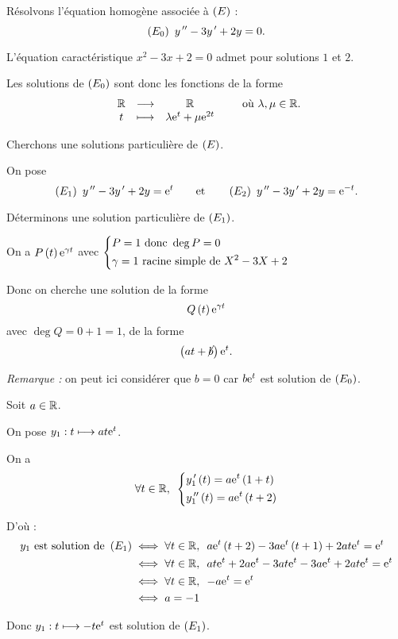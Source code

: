 \begin{corr}[1]
Résolvons l'équation homogène associée à \(\left(E\right)\) : \[\left(E_0\right)~y^{\,\prime\prime}-3y^{\,\prime}+2y=0.\]

L'équation caractéristique \(x^2-3x+2=0\) admet pour solutions \(1\) et \(2\).

Les solutions de \(\left(E_0\right)\) sont donc les fonctions de la forme \[\begin{array}[t]{ccc}\mathbb{R} & \longrightarrow & \mathbb{R} \\ t & \longmapsto & \lambda\mathrm{e}^{t}+\mu\mathrm{e}^{2t}\end{array}\qquad\text{où }\lambda,\mu\in\mathbb{R}.\]

Cherchons une solutions particulière de \(\left(E\right)\).

On pose \[\left(E_1\right)~y^{\,\prime\prime}-3y^{\,\prime}+2y=\mathrm{e}^{t}\qquad\text{et}\qquad\left(E_2\right)~y^{\,\prime\prime}-3y^{\,\prime}+2y=\mathrm{e}^{-t}.\]

Déterminons une solution particulière de \(\left(E_1\right)\).

\begin{brouill}
On a \(P\left(t\right)\mathrm{e}^{\gamma t}\) avec \(\begin{dcases}
P=1\text{ donc }\deg P=0 \\
\gamma=1\text{ racine simple de }X^2-3X+2
\end{dcases}\)

Donc on cherche une solution de la forme \[Q\left(t\right)\mathrm{e}^{\gamma t}\] avec \(\deg Q=0+1=1\), \cad de la forme \[\left(at+\cancel{b}\right)\mathrm{e}^{t}.\]

\textit{Remarque :} on peut ici considérer que \(b=0\) car \(b\mathrm{e}^{t}\) est solution de \(\left(E_0\right)\).
\end{brouill}

Soit \(a\in\mathbb{R}\).

On pose \(y_1:t\longmapsto at\mathrm{e}^{t}\).

On a \[\quantifs{\forall t\in\R}\begin{dcases}
y_1\prim\paren{t}=a\e{t}\paren{1+t} \\
y_1\seconde\paren{t}=a\e{t}\paren{t+2}
\end{dcases}\]

D'où : \[\begin{aligned}
y_1\text{ est solution de }\paren{E_1}&\ssi\quantifs{\forall t\in\R}a\e{t}\paren{t+2}-3a\e{t}\paren{t+1}+2at\e{t}=\e{t} \\
&\ssi\quantifs{\forall t\in\R}at\e{t}+2a\e{t}-3at\e{t}-3a\e{t}+2at\e{t}=\e{t} \\
&\ssi\quantifs{\forall t\in\R}-a\e{t}=\e{t} \\
&\ssi a=-1
\end{aligned}\]

Donc \(y_1:t\longmapsto-t\mathrm{e}^{t}\) est solution de \(\left(E_1\right)\).


\end{corr}
